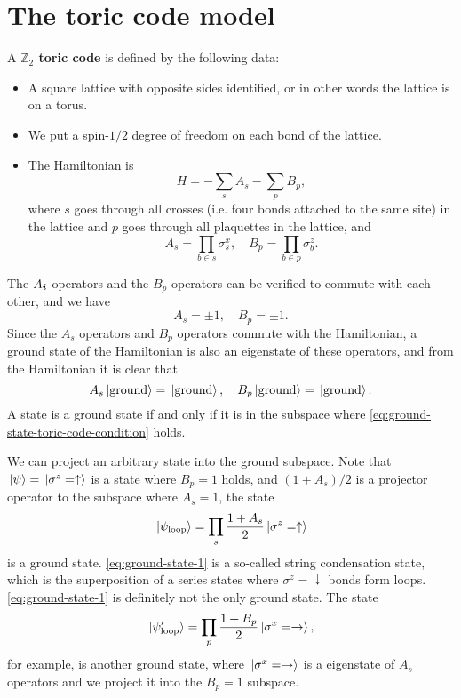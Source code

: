 \documentclass[hyperref, a4paper]{article}
\newcommand*{\concept}[1]{{\textbf{#1}}}
\begin{document}
\section{The toric code model}

A \concept{$\mathbb{Z}_2$ toric code} is defined by the following data:
\begin{itemize}
    \item A square lattice with opposite sides identified, or in other words the lattice is on a torus.
    \item We put a spin-$1/2$ degree of freedom on each bond of the lattice.
    \item The Hamiltonian is 
    \begin{equation}
        H = - \sum_{s} A_{s} - \sum_{p} B_p,
        \label{eq:toric-code}
    \end{equation}
    where $s$ goes through all crosses (i.e. four bonds attached to the same site) in the lattice and $p$ goes through all plaquettes in the lattice, and 
    \begin{equation}
        A_s = \prod_{b \in s} \sigma^x_s, \quad B_p = \prod_{b \in p} \sigma^z_b.
    \end{equation}
\end{itemize}

The $A_{\vb*{i}}$ operators and the $B_{p}$ operators can be verified to commute with each other, and we have 
\begin{equation}
    A_s = \pm 1, \quad B_p = \pm 1.
\end{equation}
Since the $A_s$ operators and $B_p$ operators commute with the Hamiltonian, 
a ground state of the Hamiltonian is also an eigenstate of these operators, 
and from the Hamiltonian it is clear that 
\begin{equation}
    A_s \ket*{\text{ground}} = \ket*{\text{ground}}, \quad B_p \ket*{\text{ground}} = \ket*{\text{ground}}.
    \label{eq:ground-state-toric-code-condition}
\end{equation}
A state is a ground state if and only if it is in the subspace where \eqref{eq:ground-state-toric-code-condition} holds.

We can project an arbitrary state into the ground subspace. 
Note that $\ket*{\psi} = \ket*{\sigma^z = \uparrow}$ is a state where $B_p = 1$ holds, 
and $(1 + A_s)/{2}$ is a projector operator to the subspace where $A_s = 1$, the state 
\begin{equation}
    \ket*{\psi_\text{loop}} = \prod_s \frac{1 + A_s}{2} \ket*{\sigma^z = \uparrow}
    \label{eq:ground-state-1}
\end{equation}
is a ground state. \eqref{eq:ground-state-1} is a so-called string condensation state, 
which is the superposition of a series states where $\sigma^z = \downarrow$ bonds form loops.
\eqref{eq:ground-state-1} is definitely not the only ground state. 
The state
\begin{equation}
    \ket*{\psi_\text{loop}'} = \prod_p \frac{1 + B_p}{2} \ket*{\sigma^x = \rightarrow},
    \label{eq:ground-state-2}
\end{equation}
for example, is another ground state, 
where $\ket*{\sigma^x = \rightarrow}$ is a eigenstate of $A_s$ operators and we project it into the $B_p = 1$ subspace.
\end{document}
